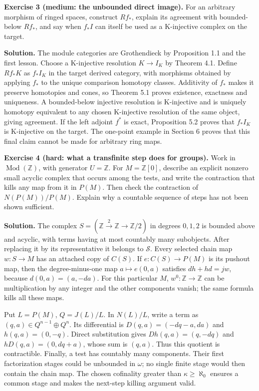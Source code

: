 \documentclass[
  english,
  11pt,
  a4paper,
]{article}
\begin{document}
\textbf{Exercise 3 (medium: the unbounded direct image).} For an
arbitrary morphism of ringed spaces, construct \(Rf_*\), explain its
agreement with bounded-below \(Rf_*\), and say when \(f_*I\) can itself
be used as a K-injective complex on the target.

\textbf{Solution.} The module categories are Grothendieck by Proposition
1.1 and the first lesson. Choose a K-injective resolution \(K\to I_K\)
by Theorem 4.1. Define \(Rf_*K\) as \(f_*I_K\) in the target derived
category, with morphisms obtained by applying \(f_*\) to the unique
comparison homotopy classes. Additivity of \(f_*\) makes it preserve
homotopies and cones, so Theorem 5.1 proves existence, exactness and
uniqueness. A bounded-below injective resolution is K-injective and is
uniquely homotopy equivalent to any chosen K-injective resolution of the
same object, giving agreement. If the left adjoint \(f^*\) is exact,
Proposition 5.2 proves that \(f_*I_K\) is K-injective on the target. The
one-point example in Section 6 proves that this final claim cannot be
made for arbitrary ring maps.

\textbf{Exercise 4 (hard: what a transfinite step does for groups).}
Work in \(\operatorname{Mod}(\mathbb Z)\), with generator
\(U=\mathbb Z\). For \(M=\mathbb Z[0]\), describe an explicit nonzero
small acyclic complex that occurs among the tests, and write the
contraction that kills any map from it in \(P(M)\). Then check the
contraction of \(N(P(M))/P(M)\). Explain why a countable sequence of
steps has not been shown sufficient.

\textbf{Solution.} The complex
\(S=(\mathbb Z\xrightarrow{2}\mathbb Z\to\mathbb Z/2)\) in degrees
\(0,1,2\) is bounded above and acyclic, with terms having at most
countably many subobjects. After replacing it by its representative it
belongs to \(\mathscr S\). Every selected chain map \(w:S\to M\) has an
attached copy of \(C(S)\). If \(e:C(S)\to P(M)\) is its pushout map,
then the degree-minus-one map \(a\mapsto e(0,a)\) satisfies
\(dh+hd=jw\), because \(d(0,a)=(a,-da)\). For this particular \(M\),
\(w^0:\mathbb Z\to\mathbb Z\) can be multiplication by any integer and
the other components vanish; the same formula kills all these maps.

Put \(L=P(M)\), \(Q=J(L)/L\). In \(N(L)/L\), write a term as
\((q,a)\in Q^{n-1}\oplus Q^n\). Its differential is
\(D(q,a)=(-dq-a,da)\) and \(h(q,a)=(0,-q)\). Direct substitution gives
\(Dh(q,a)=(q,-dq)\) and \(hD(q,a)=(0,dq+a)\), whose sum is \((q,a)\).
Thus this quotient is contractible. Finally, a test has countably many
components. Their first factorization stages could be unbounded in
\(\omega\); no single finite stage would then contain the chain map. The
chosen cofinality greater than \(\kappa\ge\aleph_0\) ensures a common
stage and makes the next-step killing argument valid.
\end{document}
